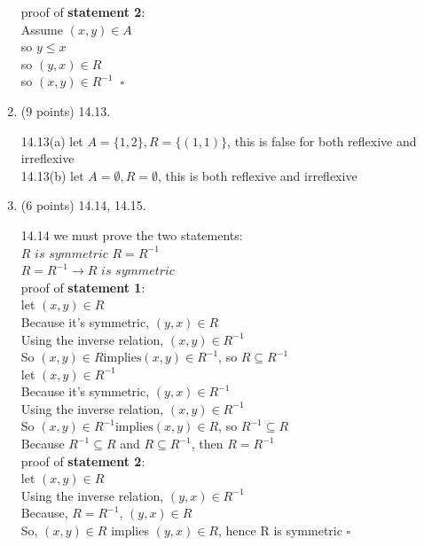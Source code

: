 \documentclass[12pt]{article}
\begin{document}
\begin{enumerate}
proof of \textbf{statement 2}:\\
Assume $(x,y) \in A$\\
so $y \leq x$\\
so $(y,x) \in R$\\
so $(x,y) \in R^{-1} \;\; \square$\\

\item (9 points)  14.13. 

 14.13(a) let $A=\{1,2\}, R= \{(1,1)\}$, this is false for both reflexive and irreflexive\\
 
 14.13(b) let $A= \emptyset, R = \emptyset$, this is both reflexive and irreflexive\\

\item (6 points) 14.14, 14.15.  

14.14 we must prove the two statements:\\
$R \textit{ is symmetric } $\rightarrow$ R=R^{-1} $\\
$R=R^{-1}\rightarrow R \textit{ is symmetric } $\\

proof of \textbf{statement 1}:\\
let $(x,y) \in R$\\
Because it's symmetric, $(y,x) \in R$\\
Using the inverse relation, $(x,y) \in R^{-1}$\\
So $(x,y) \in R \mbox{implies} (x,y) \in R^{-1} $, so $R \subseteq R^{-1}$\\

let $(x,y) \in R^{-1}$\\
Because it's symmetric, $(y,x) \in R^{-1}$\\
Using the inverse relation, $(x,y) \in R^{-1}$\\
So $(x,y) \in R^{-1} \mbox{implies} (x,y) \in R $, so $R^{-1} \subseteq R$\\

Because $R^{-1} \subseteq R$ and $R \subseteq R^{-1}$, then $R=R^{-1}$\\

proof of \textbf{statement 2}:\\
let $(x,y) \in R$\\
Using the inverse relation, $(y,x) \in R^{-1}$\\
Because, $R=R^{-1}$, $(y,x) \in R$\\
So, $(x,y) \in R$ implies $(y,x) \in R$, hence R is symmetric $\square$


\end{enumerate}
\end{document}
